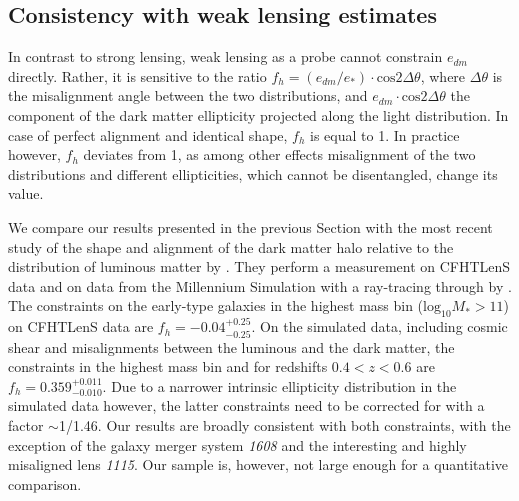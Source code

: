 \documentclass[useAMS,usenatbib]{mn2e}
\begin{document}
\subsection{Consistency with weak lensing estimates}
In contrast to strong lensing, weak lensing as a probe cannot constrain $e_{dm}$ directly. Rather, it is sensitive to the ratio $f_{h} = (e_{dm}/e_{*})\cdot\mathrm{cos} 2\Delta\theta$, where $\Delta\theta$ is the misalignment angle between the two distributions, and $e_{dm}\cdot\mathrm{cos} 2\Delta\theta$ the component of the dark matter ellipticity projected along the light distribution. In case of perfect alignment and identical shape, $f_{h}$ is equal to 1. In practice however, $f_{h}$ deviates from 1, as among other effects misalignment of the two distributions and different ellipticities, which cannot be disentangled, change its value.

We compare our results presented in the previous Section with the most recent study of the shape and alignment of the dark matter halo relative to the distribution of luminous matter by \citet{2015arXiv150704301S}. They perform a measurement on CFHTLenS data and on data from the Millennium Simulation \citep{2005Natur.435..629S} with a ray-tracing through by \citet{2009A&A...499...31H}. The constraints on the early-type galaxies in the highest mass bin ($\mathrm{log_{10}}M_{*}>11$) on CFHTLenS data are $f_{h}=-0.04^{+0.25}_{-0.25}$. On the simulated data, including cosmic shear and misalignments between the luminous and the dark matter, the constraints in the highest mass bin and for redshifts $0.4<z<0.6$ are $f_{h} = 0.359^{+0.011}_{-0.010}$. Due to a narrower intrinsic ellipticity distribution in the simulated data however, the latter constraints need to be corrected for with a factor $\sim$1/1.46. Our results are broadly consistent with both constraints, with the exception of the galaxy merger system \textit{1608} and the interesting and highly misaligned lens \textit{1115}. Our sample is, however, not large enough for a quantitative comparison.
\end{document}
